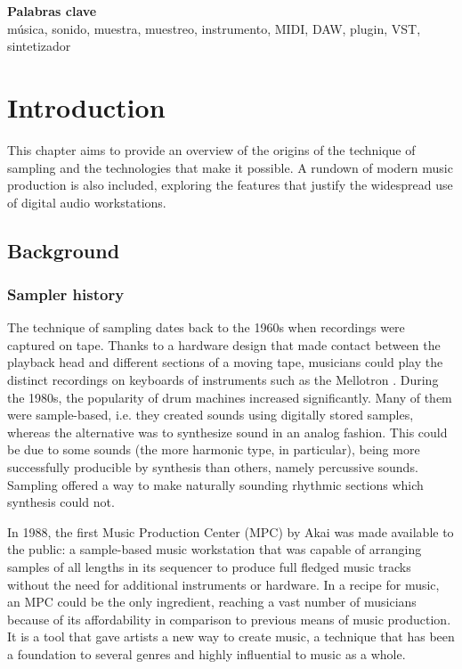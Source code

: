 \documentclass[12pt, a4paper, hidelinks]{report}
\begin{document}
	
	\vspace*{\fill}
	\large
	\textbf{Palabras clave}\\
	
	\vspace{-1em}
	\normalsize 
	\noindent música, sonido, muestra, muestreo, instrumento, MIDI, DAW, plugin, VST, sintetizador
	
	
	
	\newpage
	\vspace*{-0.009\textheight}
	\tableofcontents
	
	
	\newpage
	\chapter{Introduction} 
	This chapter aims to provide an overview of the origins of the technique of sampling and the technologies that make it possible. A rundown of modern music production is also included, exploring the features that justify the widespread use of digital audio workstations.
	\section{Background}
	\subsection{Sampler history}
	The technique of sampling dates back to the 1960s when recordings were captured on tape. Thanks to a hardware design that made contact between the playback head and different sections of a moving tape, musicians could play the distinct recordings on keyboards of instruments such as the Mellotron \cite{mellotron}.  During the 1980s, the popularity of drum machines increased significantly. Many of them were sample-based, i.e. they created sounds using digitally stored samples, whereas the alternative was to synthesize sound in an analog fashion. This could be due to some sounds (the more harmonic type, in particular), being more successfully producible by synthesis than others, namely percussive sounds. Sampling offered a way to make naturally sounding rhythmic sections which synthesis could not.\par
	In 1988, the first Music Production Center (MPC) by Akai \cite{mpc} was made available to the public: a sample-based music workstation that was capable of arranging samples of all lengths in its sequencer to produce full fledged music tracks without the need for additional instruments or hardware. In a recipe for music, an MPC could be the only ingredient, reaching a vast number of musicians because of its affordability in comparison to previous means of music production. It is a tool that gave artists a new way to create music, a technique that has been a foundation to several genres and highly influential to music as a whole.\par
	
\end{document}
